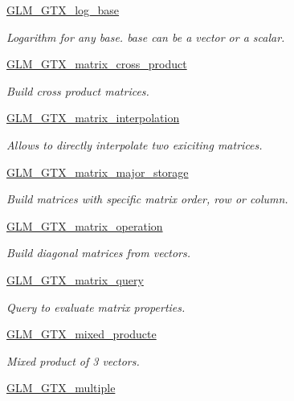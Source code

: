 \begin{DoxyCompactItemize}
\hyperlink{group__gtx__log__base}{G\+L\+M\+\_\+\+G\+T\+X\+\_\+log\+\_\+base}
\begin{DoxyCompactList}\small\item\em Logarithm for any base. base can be a vector or a scalar. \end{DoxyCompactList}\item 
\hyperlink{group__gtx__matrix__cross__product}{G\+L\+M\+\_\+\+G\+T\+X\+\_\+matrix\+\_\+cross\+\_\+product}
\begin{DoxyCompactList}\small\item\em Build cross product matrices. \end{DoxyCompactList}\item 
\hyperlink{group__gtx__matrix__interpolation}{G\+L\+M\+\_\+\+G\+T\+X\+\_\+matrix\+\_\+interpolation}
\begin{DoxyCompactList}\small\item\em Allows to directly interpolate two exiciting matrices. \end{DoxyCompactList}\item 
\hyperlink{group__gtx__matrix__major__storage}{G\+L\+M\+\_\+\+G\+T\+X\+\_\+matrix\+\_\+major\+\_\+storage}
\begin{DoxyCompactList}\small\item\em Build matrices with specific matrix order, row or column. \end{DoxyCompactList}\item 
\hyperlink{group__gtx__matrix__operation}{G\+L\+M\+\_\+\+G\+T\+X\+\_\+matrix\+\_\+operation}
\begin{DoxyCompactList}\small\item\em Build diagonal matrices from vectors. \end{DoxyCompactList}\item 
\hyperlink{group__gtx__matrix__query}{G\+L\+M\+\_\+\+G\+T\+X\+\_\+matrix\+\_\+query}
\begin{DoxyCompactList}\small\item\em Query to evaluate matrix properties. \end{DoxyCompactList}\item 
\hyperlink{group__gtx__mixed__product}{G\+L\+M\+\_\+\+G\+T\+X\+\_\+mixed\+\_\+producte}
\begin{DoxyCompactList}\small\item\em Mixed product of 3 vectors. \end{DoxyCompactList}\item 
\hyperlink{group__gtx__multiple}{G\+L\+M\+\_\+\+G\+T\+X\+\_\+multiple}

\end{DoxyCompactItemize}
